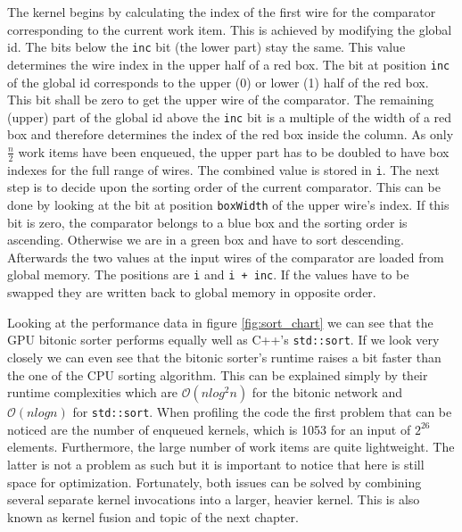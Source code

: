 

The kernel begins by calculating the index of the first wire for the comparator corresponding to the current work item. This is achieved by modifying the global id. The bits below the \lstinline!inc! bit (the lower part) stay the same. This value determines the wire index in the upper half of a red box. The bit at position \lstinline!inc! of the global id corresponds to the upper (0) or lower (1) half of the red box. This bit shall be zero to get the upper wire of the comparator. The remaining (upper) part of the global id above the \lstinline!inc! bit is a multiple of the width of a red box and therefore determines the index of the red box inside the column. As only $\frac{n}{2}$ work items have been enqueued, the upper part has to be doubled to have box indexes for the full range of wires. The combined value is stored in \lstinline!i!.
The next step is to decide upon the sorting order of the current comparator. This can be done by looking at the bit at position \lstinline!boxWidth! of the upper wire's index. If this bit is zero, the comparator belongs to a blue box and the sorting order is ascending. Otherwise we are in a green box and have to sort descending.
Afterwards the two values at the input wires of the comparator are loaded from global memory. The positions are \lstinline!i! and \lstinline!i + inc!. If the values have to be swapped they are written back to global memory in opposite order.

Looking at the performance data in figure \ref{fig:sort_chart} we can see that the GPU bitonic sorter performs equally well as C++'s \lstinline!std::sort!. If we look very closely we can even see that the bitonic sorter's runtime raises a bit faster than the one of the CPU sorting algorithm. This can be explained simply by their runtime complexities which are $\mathcal{O}(n log^2 n)$ for the bitonic network and $\mathcal{O}(n log n)$ for \lstinline!std::sort!.
When profiling the code the first problem that can be noticed are the number of enqueued kernels, which is 1053 for an input of $2^{26}$ elements. Furthermore, the large number of work items are quite lightweight. The latter is not a problem as such but it is important to notice that here is still space for optimization. Fortunately, both issues can be solved by combining several separate kernel invocations into a larger, heavier kernel. This is also known as kernel fusion and topic of the next chapter.


